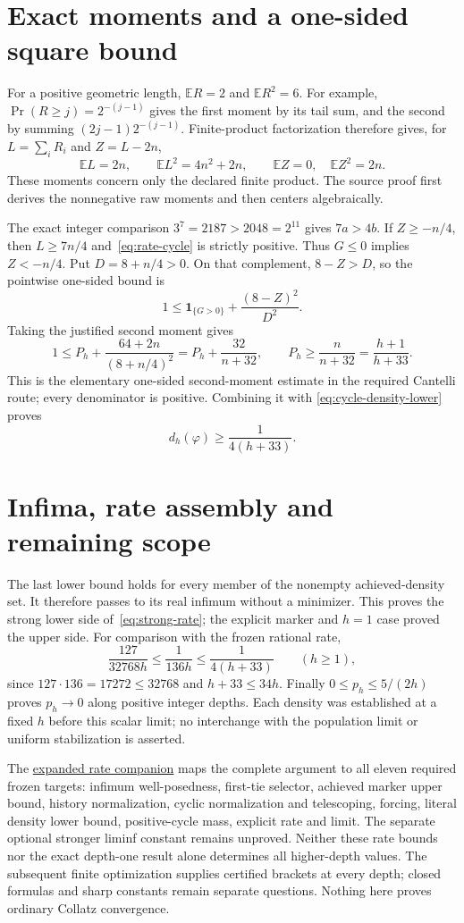 \documentclass[11pt,letterpaper]{article}
\newcommand{\ind}{\mathbf{1}}
\begin{document}
\section{Exact moments and a one-sided square bound}
For a positive geometric length, $\mathbb E R=2$ and $\mathbb E R^2=6$.
For example, $\Pr(R\ge j)=2^{-(j-1)}$ gives the first moment by its tail sum,
and the second by summing $(2j-1)2^{-(j-1)}$. Finite-product factorization
therefore gives, for $L=\sum_iR_i$ and $Z=L-2n$,
\[
 \mathbb E L=2n,\qquad \mathbb E L^2=4n^2+2n,\qquad
 \mathbb E Z=0,\quad\mathbb E Z^2=2n.
\]
These moments concern only the declared finite product. The source proof
first derives the nonnegative raw moments and then centers algebraically.

The exact integer comparison $3^7=2187>2048=2^{11}$ gives $7a>4b$.
If $Z\ge-n/4$, then $L\ge7n/4$ and~\eqref{eq:rate-cycle} is strictly positive.
Thus $G\le0$ implies $Z<-n/4$. Put $D=8+n/4>0$. On that complement,
$8-Z>D$, so the pointwise one-sided bound is
\[
 1\le\ind_{\{G>0\}}+\frac{(8-Z)^2}{D^2}.
\]
Taking the justified second moment gives
\[
 1\le P_h+\frac{64+2n}{(8+n/4)^2}
   =P_h+\frac{32}{n+32},\qquad
 P_h\ge\frac{n}{n+32}=\frac{h+1}{h+33}.
\]
This is the elementary one-sided second-moment estimate in the required
Cantelli route; every denominator is positive. Combining it with
\eqref{eq:cycle-density-lower} proves
\[
 d_h(\varphi)\ge\frac1{4(h+33)}.
\]

\section{Infima, rate assembly and remaining scope}
The last lower bound holds for every member of the nonempty achieved-density
set. It therefore passes to its real infimum without a minimizer. This proves
the strong lower side of~\eqref{eq:strong-rate}; the explicit marker and $h=1$
case proved the upper side. For comparison with the frozen rational rate,
\[
 \frac{127}{32768h}\le\frac1{136h}\le\frac1{4(h+33)}\qquad(h\ge1),
\]
since $127\cdot136=17272\le32768$ and $h+33\le34h$. Finally
$0\le p_h\le5/(2h)$ proves $p_h\to0$ along positive integer depths.
Each density was established at a fixed $h$ before this scalar limit; no
interchange with the population limit or uniform stabilization is asserted.

The \href{../../lean/external_rate/RATE_PROOF.md}{expanded rate companion}
maps the complete argument to all eleven required frozen targets: infimum
well-posedness, first-tie selector, achieved marker upper bound, history
normalization, cyclic normalization and telescoping, forcing, literal density
lower bound, positive-cycle mass, explicit rate and limit. The separate
optional stronger liminf constant remains unproved. Neither these rate bounds
nor the exact depth-one result alone determines all higher-depth values.
The subsequent finite optimization supplies certified brackets at every
depth; closed formulas and sharp constants remain separate questions.
Nothing here proves ordinary Collatz convergence.
\end{document}
